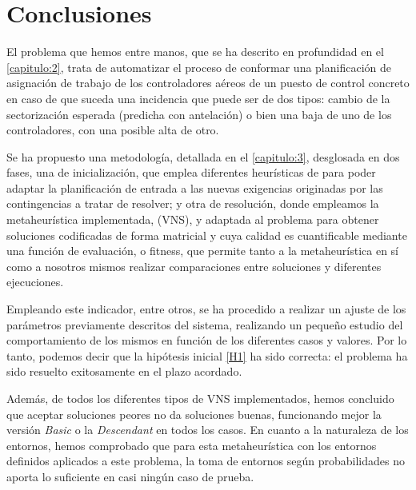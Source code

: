 \graphicspath{{capitulos/Capitulo6-Conclusiones/recursos/}}


\section{Conclusiones} \label{capitulo:6}

El problema que hemos entre manos, que se ha descrito en profundidad en el \autoref{capitulo:2}, trata de automatizar el proceso de conformar una planificación de asignación de trabajo de los controladores aéreos de un puesto de control concreto en caso de que suceda una incidencia que puede ser de dos tipos: cambio de la sectorización esperada (predicha con antelación) o bien una baja de uno de los controladores, con una posible alta de otro.



Se ha propuesto una metodología, detallada en el \autoref{capitulo:3}, desglosada en dos fases, una de inicialización, que emplea diferentes heurísticas de para poder adaptar la planificación de entrada a las nuevas exigencias originadas por las contingencias a tratar de resolver; y otra de resolución, donde empleamos la metaheurística implementada, \vns{} (VNS),  y adaptada al problema para obtener soluciones codificadas de forma matricial y cuya calidad es cuantificable mediante una función de evaluación, o fitness, que permite tanto a la metaheurística en sí como a nosotros mismos realizar comparaciones entre soluciones y diferentes ejecuciones. 

Empleando este indicador, entre otros, se ha procedido a realizar un ajuste de los parámetros previamente descritos del sistema, realizando un pequeño estudio del comportamiento de los mismos en función de los diferentes casos y valores. Por lo tanto, podemos decir que la hipótesis inicial \ref{H1} ha sido correcta: el problema ha sido resuelto exitosamente en el plazo acordado.

Además, de todos los diferentes tipos de VNS implementados, hemos concluido que aceptar soluciones peores no da soluciones buenas, funcionando mejor la versión \textit{Basic} o la \textit{Descendant} en todos los casos. En cuanto a la naturaleza de los entornos, hemos comprobado que para esta metaheurística con los entornos definidos aplicados a este problema, la toma de entornos según probabilidades no aporta lo suficiente en casi ningún caso de prueba.

